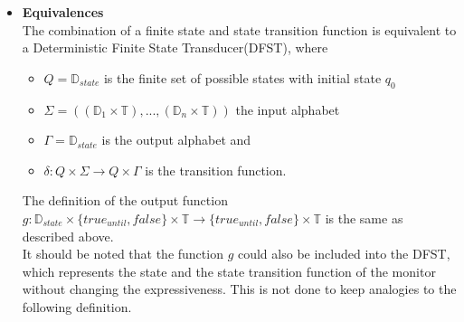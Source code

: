 \begin{itemize}
			\item{\textbf{Equivalences}}\\
				The combination of a finite state and state transition function is equivalent to a Deterministic Finite State Transducer(DFST), where
				\begin{itemize}
					\item
						$Q=\mathbb{D}_{state}$ is the finite set of possible states with initial state $q_0$
					\item
						$\Sigma=((\mathbb{D}_1\times \mathbb{T}),...,(\mathbb{D}_n\times \mathbb{T}))$ the input alphabet
					\item
						$\Gamma = \mathbb D_{state}$ is the output alphabet and
					\item
						$\delta: Q\times \Sigma\rightarrow Q\times\Gamma$ is the transition function.
				\end{itemize}
				The definition of the output function $g: \mathbb{D}_{state}\times\{true_{until}, false\}\times \mathbb{T}\rightarrow \{true_{until}, false\}\times \mathbb{T}$ is the same as described above.\\
				It should be noted that the function $g$ could also be included into the DFST, which represents the state and the state transition function of the monitor without changing the expressiveness. This is not done to keep analogies to the following definition.
		\end{itemize}
	
